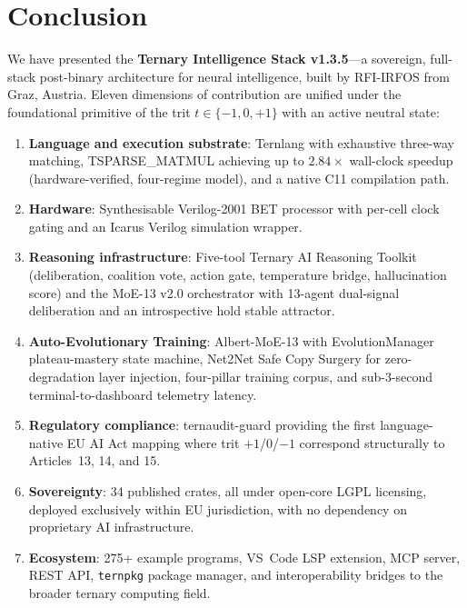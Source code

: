 \documentclass[journal,10pt,twocolumn]{IEEEtran}
\begin{document}
\section{Conclusion}
\label{sec:conclusion}

We have presented the \textbf{Ternary Intelligence Stack v1.3.5}---a
sovereign, full-stack post-binary architecture for neural intelligence,
built by RFI-IRFOS from Graz, Austria. Eleven dimensions of contribution
are unified under the foundational primitive of the trit $t \in \{-1,0,+1\}$
with an active neutral state:

\begin{enumerate}
  \item \textbf{Language and execution substrate}: Ternlang with exhaustive
        three-way matching, TSPARSE\_MATMUL achieving up to $2.84\times$
        wall-clock speedup (hardware-verified, four-regime model), and a
        native C11 compilation path.

  \item \textbf{Hardware}: Synthesisable Verilog-2001 BET processor with
        per-cell clock gating and an Icarus Verilog simulation wrapper.

  \item \textbf{Reasoning infrastructure}: Five-tool Ternary AI Reasoning
        Toolkit (deliberation, coalition vote, action gate, temperature
        bridge, hallucination score) and the MoE-13 v2.0 orchestrator with
        13-agent dual-signal deliberation and an introspective hold stable
        attractor.

  \item \textbf{Auto-Evolutionary Training}: Albert-MoE-13 with
        EvolutionManager plateau-mastery state machine, Net2Net Safe Copy
        Surgery for zero-degradation layer injection, four-pillar training
        corpus, and sub-3-second terminal-to-dashboard telemetry latency.

  \item \textbf{Regulatory compliance}: ternaudit-guard providing the first
        language-native EU AI Act mapping where trit $+1$/0/$-1$ correspond
        structurally to Articles~13, 14, and 15.

  \item \textbf{Sovereignty}: 34 published crates, all under open-core LGPL
        licensing, deployed exclusively within EU jurisdiction, with no
        dependency on proprietary AI infrastructure.

  \item \textbf{Ecosystem}: 275+ example programs, VS~Code LSP extension,
        MCP server, REST API, \texttt{ternpkg} package manager, and
        interoperability bridges to the broader ternary computing field.
\end{enumerate}
\end{document}
